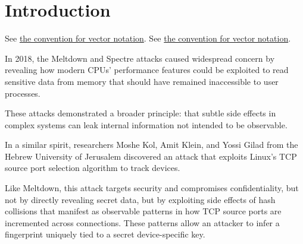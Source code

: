 \documentclass{report}
\begin{document}
\fontsize{8pt}{9pt}\selectfont
{}



\tableofcontents
\thispagestyle{empty}
\clearpage
\pagestyle{plain}

\listoffigures

\clearpage
{}
\pagestyle{default}

\chapter{Introduction}
\label{sec:introduction}

See \hyperref[conv:vector]{the convention for vector notation}.
See \hyperref[conv:real]{the convention for vector notation}.

In 2018, the \alert{Meltdown} and \alert{Spectre} attacks caused widespread concern by revealing how modern CPUs’ performance features could be exploited to read sensitive data from memory that should have remained inaccessible to user processes.

These attacks demonstrated a broader principle: that subtle side effects in complex systems can leak internal information not intended to be observable.

In a similar spirit, researchers Moshe Kol, Amit Klein, and Yossi Gilad from the Hebrew University of Jerusalem discovered an attack that exploits Linux’s \alert{TCP source port selection algorithm} to track devices.

Like Meltdown, this attack targets \alert{security} and compromises confidentiality, but not by directly revealing secret data, but by exploiting side effects of \alert{hash collisions} that manifest as observable patterns in how \alert{TCP source ports} are incremented across connections. These patterns allow an attacker to infer a fingerprint uniquely tied to a \alert{secret device-specific key}.
\end{document}
